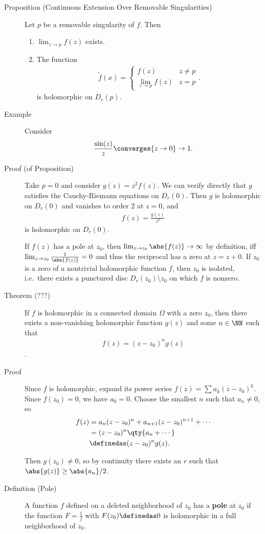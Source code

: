 \begin{description}
\item[Proposition (Continuous Extension Over Removable Singularities)]
Let \(p\) be a removable singularity of \(f\). Then

\begin{enumerate}
\def\labelenumi{\arabic{enumi}.}
\item
  \(\lim_{z\to p} f(z)\) exists.
\item
  The function \begin{align*}
  \tilde f(x) = \begin{cases}f(z) & z\neq p \\ \lim_{z\to p} f(z) & z=p  \end{cases}
  .\end{align*} is holomorphic on \(D_r(p)\).
\end{enumerate}
\item[Example]
Consider
\begin{align*}\frac{\sin(z)}{z} \converges{z\to 0}\to 1.\end{align*}
\item[Proof (of Proposition)]
Take \(p=0\) and consider \(g(z) = z^2 f(z)\). We can verify directly
that \(g\) satisfies the Cauchy-Riemann equations on \(D_r(0)\). Then
\(g\) is holomorphic on \(D_r(0)\) and vanishes to order 2 at \(z=0\),
and
\begin{align*}f(z) = \frac{g(z)}{z^2}\end{align*} is holomorphic on
\(D_r(0)\).

If \(f(z)\) has a pole at \(z_0\), then
\(\lim_{z\to z_0} \abs{f(z)} \to \infty\) by definition, iff
\(\lim_{z\to z_0} \frac{1}{\abs{f(z)}} = 0\) and thus the reciprocal has
a zero at \(z=z+0\). If \(z_0\) is a zero of a nontrivial holomorphic
function \(f\), then \(z_0\) is isolated, i.e.~there exists a punctured
disc \(D_r(z_0)\setminus z_0\) on which \(f\) is nonzero.
\item[Theorem (???)]
If \(f\) is holomorphic in a connected domain \(\Omega\) with a zero
\(z_0\), then there exists a non-vanishing holomorphic function \(g(z)\)
and some \(n\in \NN\) such that
\begin{align*}f(z) = (z-z_0)^n g(z)\end{align*}.
\item[Proof]
Since \(f\) is holomorphic, expand its power series
\(f(z) = \sum a_k (z-z_0)^k\). Since \(f(z_0) = 0\), we have
\(a_0 = 0\). Choose the smallest \(n\) such that \(a_n \neq 0\), so
\begin{align*}
f(z) 
&= a_n(z-z_0)^n + a_{n+1}(z-z_0)^{n+1} + \cdots \\
&= (z-z_0)^n \qty{a_n + \cdots} \\
&\definedas (z-z_0)^n g(z)
.\end{align*}

Then \(g(z_0) \neq 0\), so by continuity there exists an \(r\) such that
\(\abs{g(z)} \geq \abs{a_n}/2\).
\item[Definition (Pole)]
A function \(f\) defined on a deleted neighborhood of \(z_0\) has a
\textbf{pole} at \(z_0\) if the function \(F = \frac 1 f\) with
\(F(z_0) \definedas 0\) is holomorphic in a full neighborhood of
\(z_0\).
\end{description}

